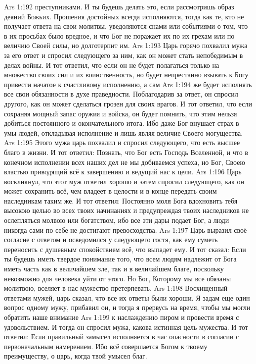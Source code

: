 \vs Ars 1:192
преступниками. И ты будешь делать это, если рассмотришь образ деяний Божьих. Прошения достойных всегда исполняются, тогда как те, кто не получает ответа на свои молитвы, уведоляются снами или событиями о том, что в их просьбах было вредное, и что Бог не поражает их по их грехам или по величию Своей силы, но долготерпит им.
\vs Ars 1:193
Царь горячо похвалил мужа за его ответ и спросил следующего за ним, как он может стать непобедимым в делах войны. И тот ответил, что если он не будет полагаться только на множество своих сил и их воинственность, но будет непрестанно взывать к Богу привести начатое к счастливому исполнению, а сам
\vs Ars 1:194
же будет исполнять все свои обязанности в духе праведности.
Поблагодарив за ответ, он спросил другого, как он может сделаться грозен для своих врагов. И тот ответил, что если сохраняя мощный запас оружия и войска, он будет помнить, что этим нельзя добиться постоянного и окончательного итога. Ибо даже Бог внушает страх в умы людей, откладывая исполнение и лишь являя величие Своего могущества.
\vs Ars 1:195
Этого мужа царь похвалил и спросил следующего, что есть высшее благо в жизни. И тот ответил: Познать, что Бог есть Господь Вселенной, и что в конечном исполнении всех наших дел не мы добиваемся успеха, но Бог, Своею властью приводящий всё к завершению и ведущий нас к цели.
\vs Ars 1:196
Царь воскликнул, что этот муж ответил хорошо и затем спросил следующего, как он может сохранить всё, чем владеет в целости и в конце передать своим наследникам таким же. И тот ответил: Постоянно моля Бога вдохновить тебя высокою целью во всех твоих начинаниях и предупреждая твоих наследников не ослепляться молвою или богатством, ибо все эти дары подает Бог, а люди никогда сами по себе не достигают превосходства.
\vs Ars 1:197
Царь выразил своё согласие с ответом и осведомился у следующего гостя, как ему суметь переносить с душевным спокойствием всё, что выпадет ему. И тот сказал: Если ты будешь иметь твердое понимание того, что всем людям надлежит от Бога иметь часть как в величайшем зле, так и в величайшем благе, поскольку невозможно для человека уйти от этого. Но Бог, Которому мы все обязаны молитвою, вселяет в нас мужество претерпевать.
\vs Ars 1:198
Восхищенный ответами мужей, царь сказал, что все их ответы были хороши. Я задам еще один вопрос одному мужу, прибавил он, и тогда я прервусь на время, чтобы мы могли обратить наше внимание
\vs Ars 1:199
к наслаждению пиром и провести время с удовольствием. И тогда он спросил мужа, какова истинная цель мужества. И тот ответил: Если правильный замысел исполняется в час опасности в согласии с первоначальным намерением. Ибо всё совершается Богом к твоему преимуществу, о царь, когда твой умысел благ.
